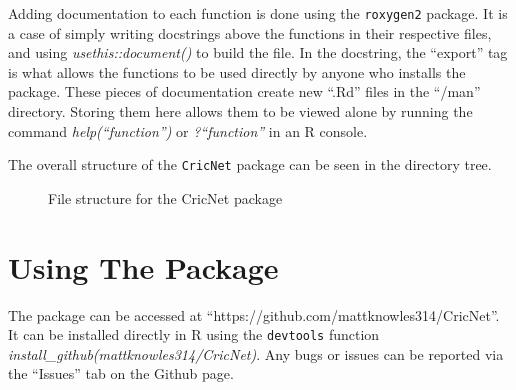 Adding documentation to each function is done using the \verb|roxygen2| package. It is a case of simply writing docstrings above the functions in their respective files, and using \textit{usethis::document()} to build the file. In the docstring, the ``export'' tag is what allows the functions to be used directly by anyone who installs the package.  
These pieces of documentation create new ``.Rd'' files in the ``/man'' directory. Storing them here allows them to be viewed alone by running the command \textit{help(``function'')} or \textit{?``function''} in an R console. 

The overall structure of the \verb|CricNet| package can be seen in the directory tree.\\

\begin{figure}[h]
\caption{File structure for the CricNet package}

    


\end{figure}

\section{Using The Package}
The package can be accessed at ``https://github.com/mattknowles314/CricNet''. It can be installed directly in R using the \verb|devtools| function \textit{install\_github(mattknowles314/CricNet)}. Any bugs or issues can be reported via the ``Issues'' tab on the Github page. 
